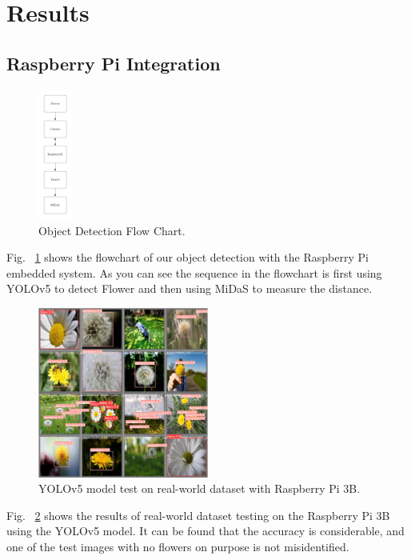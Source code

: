 \section{Results}

\subsection{Raspberry Pi Integration}

\begin{figure}[H]
    \centerline{\includegraphics[width=0.1\textwidth]{Figures/Results/Object Detection.png}}
    \caption{Object Detection Flow Chart.}
    \label{fig9}
\end{figure}

Fig. ~\ref{fig9} shows the flowchart of our object detection with the Raspberry Pi embedded system. As you can see the sequence in the flowchart is first using YOLOv5 to detect Flower and then using MiDaS to measure the distance.

\begin{figure}[H]
    \centerline{\includegraphics[width=0.5\textwidth]{Figures/Results/RPi_YOLOv5.png}}
    \caption{YOLOv5 model test on real-world dataset with Raspberry Pi 3B.}
    \label{fig10}
\end{figure}

Fig. ~\ref{fig10} shows the results of real-world dataset testing on the Raspberry Pi 3B using the YOLOv5 model. It can be found that the accuracy is considerable, and one of the test images with no flowers on purpose is not misidentified.

